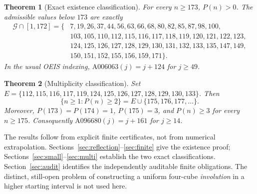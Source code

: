 \documentclass[9pt]{extarticle}
\newtheorem{theorem}{Theorem}[section]
\newcommand{\G}{\mathcal G}
\begin{document}
\begin{theorem}[Exact existence classification]\label{thm:membership}
For every $n\ge173$, $P(n)>0$. The admissible values below $173$ are exactly
\begin{equation}\label{eq:small}
\begin{split}
\G\cap[1,172]=\{&7,19,26,37,44,56,63,66,68,80,82,85,87,98,100,\\
&103,105,110,112,115,116,117,118,119,120,121,122,123,\\
&124,125,126,127,128,129,130,131,132,133,135,147,149,\\
&150,151,152,155,156,159,171\}.
\end{split}
\end{equation}
In the usual OEIS indexing, $\mathrm{A006063}(j)=j+124$ for $j\ge49$.
\end{theorem}
\begin{theorem}[Multiplicity classification]\label{thm:multi}
Set $E=\{112,115,116,117,119,124,125,126,127,128,129,130,133\}$. Then
\[
\{n\ge1:P(n)\ge2\}=E\cup\{175,176,177,\dots\}.
\]
Moreover, $P(173)=P(174)=1$, $P(175)=3$, and $P(n)\ge3$ for every $n\ge175$. Consequently $\mathrm{A096680}(j)=j+161$ for $j\ge14$.
\end{theorem}

The results follow from explicit finite certificates, not from numerical extrapolation. Sections~\ref{sec:reflection}--\ref{sec:finite} give the existence proof; Sections~\ref{sec:small}--\ref{sec:multi} establish the two exact classifications. Section~\ref{sec:audit} identifies the independently auditable finite obligations. The distinct, still-open problem of constructing a uniform four-cube \emph{involution} in a higher starting interval is not used here.
\end{document}
